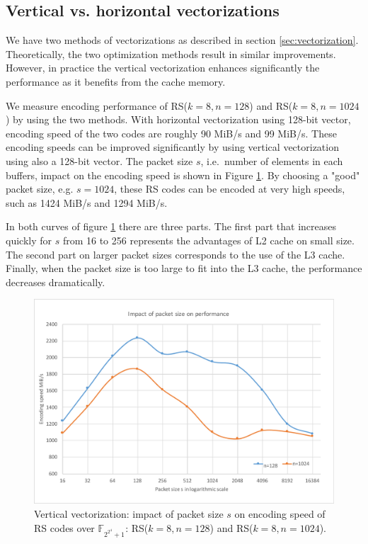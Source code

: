 \documentclass[oneside,9pt]{article}
\newcommand{\gf}[2][]{ \mathbb{F}_{{#2}^{#1}} }
\begin{document}
\subsection{Vertical vs. horizontal vectorizations}

We have two methods of vectorizations as described in section \ref{sec:vectorization}. Theoretically, the two optimization methods result in similar improvements. However, in practice  the vertical vectorization enhances significantly the performance as it benefits from the cache memory.

We measure encoding performance of RS($k=8, n=128$) and RS($k=8, n=1024$) by using the two methods. With horizontal vectorization using 128-bit vector, encoding speed of the two codes are  roughly 90 MiB/s and 99 MiB/s. These encoding speeds can be improved significantly by using vertical vectorization using also a 128-bit vector. The packet size $s$, i.e.\ number of elements in each buffers, impact on the encoding speed is shown in Figure \ref{fig:fnt_vertical_vec_pkt_size}. By choosing a "good" packet size, e.g. $s=1024$, these RS codes can be encoded at very high speeds, such as 1424 MiB/s and 1294 MiB/s.

In both curves of figure \ref{fig:fnt_vertical_vec_pkt_size} there are three parts. The first part that increases quickly for $s$ from 16 to 256 represents the advantages of L2 cache on small size. The second part on larger packet sizes corresponds to the use of the L3 cache. Finally, when the packet size is too large to fit into the L3 cache, the performance decreases dramatically.

\begin{figure}[!ht]
\centering
\includegraphics[width=0.7\columnwidth]{fnt_vertical_vec_pkt_size.pdf}
\caption{Vertical vectorization: impact of packet size $s$ on encoding speed of RS codes over $\gf{2^{2^4}+1}$: RS($k=8, n=128$) and RS($k=8, n=1024$).}
\label{fig:fnt_vertical_vec_pkt_size}
\end{figure}
\end{document}

